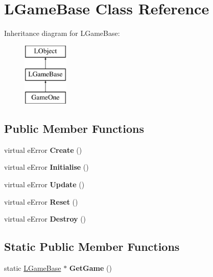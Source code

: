 \hypertarget{class_l_game_base}{\section{L\-Game\-Base Class Reference}
\label{class_l_game_base}
}
Inheritance diagram for L\-Game\-Base\-:\begin{figure}[H]
\begin{center}
\leavevmode
\includegraphics[height=3.000000cm]{class_l_game_base}
\end{center}
\end{figure}
\subsection*{Public Member Functions}
\begin{DoxyCompactItemize}
\item 
\hypertarget{class_l_game_base_a3365858f9e03e10b57a6e98b1c727814}{virtual e\-Error {\bfseries Create} ()}\label{class_l_game_base_a3365858f9e03e10b57a6e98b1c727814}

\item 
\hypertarget{class_l_game_base_a77672fe6db779dc83edec051c8c4dc32}{virtual e\-Error {\bfseries Initialise} ()}\label{class_l_game_base_a77672fe6db779dc83edec051c8c4dc32}

\item 
\hypertarget{class_l_game_base_ad45e09e8fee15456c145644f0efc0c88}{virtual e\-Error {\bfseries Update} ()}\label{class_l_game_base_ad45e09e8fee15456c145644f0efc0c88}

\item 
\hypertarget{class_l_game_base_a47c0cc5cb8f7cc4c733e5c1599db27c9}{virtual e\-Error {\bfseries Reset} ()}\label{class_l_game_base_a47c0cc5cb8f7cc4c733e5c1599db27c9}

\item 
\hypertarget{class_l_game_base_a741614c221d39efb8296d72f3011970b}{virtual e\-Error {\bfseries Destroy} ()}\label{class_l_game_base_a741614c221d39efb8296d72f3011970b}

\end{DoxyCompactItemize}
\subsection*{Static Public Member Functions}
\begin{DoxyCompactItemize}
\item 
\hypertarget{class_l_game_base_aeb53fd467d303a2fb78f1b4f0e8882df}{static \hyperlink{class_l_game_base}{L\-Game\-Base} $\ast$ {\bfseries Get\-Game} ()}\label{class_l_game_base_aeb53fd467d303a2fb78f1b4f0e8882df}

\end{DoxyCompactItemize}


